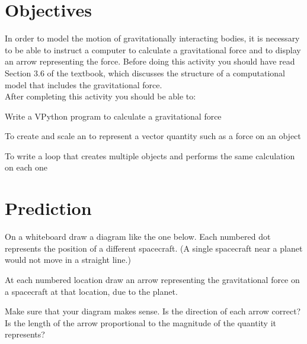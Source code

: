\documentclass[10pt]{article}
\begin{document}
 

\begin{center}
{}
\end{center}

\section*{Objectives}

In order to model the motion of gravitationally interacting bodies, it is necessary to be able to instruct a computer to calculate a gravitational force and to display an arrow representing the force. Before doing this activity you should have read Section 3.6 of the \MI textbook, which discusses the structure of a computational model that includes the gravitational force.\\

After completing this activity you should be able to:\\

\begin{compactitem}[\color{MIBlue}$\bullet$]
\item Write a VPython program to calculate a gravitational force
\item To create and scale an  to represent a vector quantity such as a force on an object
\item To write a \while loop that creates multiple objects and performs the same calculation on each one\\
\end{compactitem}

\section{Prediction}

\begin{compactitem}[\color{MIRed}$\Rightarrow$]
\item On a whiteboard draw a diagram like the one below.  Each numbered dot represents the position of a different spacecraft. (A single spacecraft near a planet would not move in a straight line.)
\item At each numbered location draw an arrow representing the gravitational force on a spacecraft at that location, due to the planet.
\item Make sure that your diagram makes sense.  Is the direction of each arrow correct? Is the length of the arrow proportional to the magnitude of the quantity it represents?\\
\end{compactitem}
\end{document}
